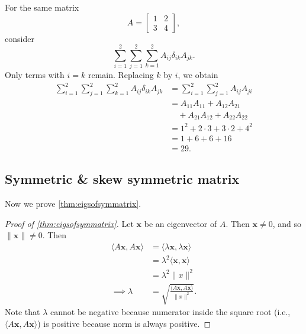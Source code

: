 \begin{example}
	For the same matrix
	\[
		A=\begin{bmatrix}1&2\\3&4\end{bmatrix},
	\]
	consider
	\[
		\sum_{i=1}^{2}\sum_{j=1}^{2}\sum_{k=1}^{2}
		A_{ij}\delta_{ik}A_{jk}.
	\]
	Only terms with \(i=k\) remain. Replacing \(k\)
	by \(i\), we obtain
	\begin{align*}
		\sum_{i=1}^{2}\sum_{j=1}^{2}\sum_{k=1}^{2}
		A_{ij}\delta_{ik}A_{jk}
		 & =
		\sum_{i=1}^{2}\sum_{j=1}^{2}A_{ij}A_{ji} \\
		 & =A_{11}A_{11}+A_{12}A_{21}            \\
		 & \quad+A_{21}A_{12}+A_{22}A_{22}       \\
		 & =1^2+2\cdot3+3\cdot2+4^2              \\
		 & =1+6+6+16                             \\
		 & =29.
	\end{align*}
\end{example}

\subsection{Symmetric \& skew symmetric matrix}

Now we prove \autoref{thm:eigsofsymmatrix}.

\begin{proof}[Proof of \autoref{thm:eigsofsymmatrix}]
	Let \( \mathbf{x} \) be an eigenvector of \( A \). Then  \( \mathbf{x} \neq 0 \), and so \( \|\mathbf{x}\| \neq 0 \). Then
	\begin{align}
		\langle A \mathbf{x}, A \mathbf{x} \rangle & = \langle \lambda \mathbf{x}, \lambda \mathbf{x} \rangle            \\
		                                           & = \lambda^2 \langle \mathbf{x}, \mathbf{x} \rangle                  \\
		                                           & = \lambda^2 \|x\|^2                                                 \\
		\implies \lambda                           & = \sqrt{\frac{\langle A \mathbf{x}, A \mathbf{x} \rangle}{\|x\|^2}}
		\label{eq:orthogonality-9}
		.\end{align}
	Note that \( \lambda \) cannot be negative because numerator inside the square root (i.e., \( \langle A \mathbf{x}, A \mathbf{x} \rangle \)) is positive because norm is always positive.
\end{proof}

